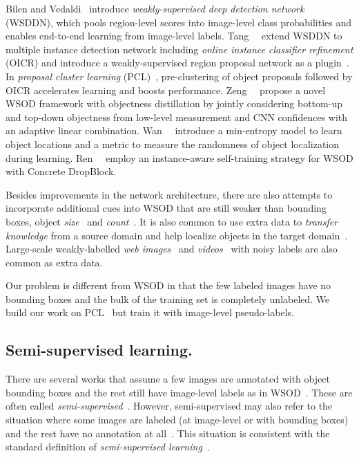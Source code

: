 \documentclass[review]{elsarticle}
\begin{document}
Bilen and Vedaldi~\cite{wsddn} introduce \emph{weakly-supervised deep detection network} (WSDDN), which pools region-level scores into image-level class probabilities and enables end-to-end learning from image-level labels. 
Tang~\etal~\cite{tang2017cvpr} extend WSDDN to multiple instance detection network including \emph{online instance classifier refinement} (OICR) and introduce a weakly-supervised {region proposal network} as a plugin~\cite{tang2018eccv}. In \emph{proposal cluster learning} (PCL)~\cite{tang2018pami}, pre-clustering of object proposals followed by OICR accelerates learning and boosts performance. 
Zeng~\etal~\cite{zeng2019wsod2} propose a novel WSOD framework with objectness distillation by jointly considering bottom-up and top-down objectness from low-level measurement and CNN confidences with an adaptive linear combination. 
Wan~\etal~\cite{pami2019minentropy} introduce a min-entropy  model to learn object locations and a metric to measure the
randomness of object localization during learning. {Ren~\etal~\cite{cvpr20efficientwsod} employ an instance-aware self-training strategy for WSOD with Concrete DropBlock. } 



Besides improvements in the network architecture, there are also attempts to incorporate additional cues into WSOD that are still weaker than bounding boxes, \eg object \emph{size}~\cite{shi2016eccv} and \emph{count}~\cite{gao2018eccv}.
It is also common to use extra data to \emph{transfer knowledge} from a source domain and help localize objects in the target domain~\cite{shi2017iccv,uijlings2018revisiting}.
Large-scale weakly-labelled \emph{web images}~\cite{guo2018eccv,tao2018tmm} and \emph{videos}~\cite{singh2019cvpr,liang2015cvpr}
with noisy labels are also common as extra data.

Our problem is different from WSOD in that the few labeled images have no bounding boxes and the bulk of the training set is completely unlabeled.
We build our work on PCL~\cite{tang2018pami} but train it with image-level pseudo-labels.


\subsection{Semi-supervised learning.}
There are several works that assume a few images are annotated with object bounding boxes and the rest still have image-level labels as in WSOD~\cite{tang2016cvpr,hoffman2015cvpr,yan2017arxiv}. These are often called \emph{semi-supervised}~\cite{tang2016cvpr,yan2017arxiv}. However, semi-supervised may also refer to the situation where some images are labeled (at image-level or with bounding boxes) and the rest have {no annotation at all}~\cite{1802.06964,RDG+18}. This situation is consistent with the standard definition of \emph{semi-supervised learning}~\cite{CSZ06}.
\end{document}
